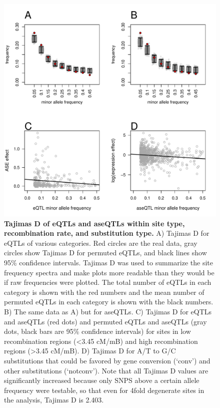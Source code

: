 \begin{figure}[ht]
      \centering
       \includegraphics[width=\linewidth]{Ch3FigS5}
    \caption{\textbf{Tajima\textsc{}s D of eQTLs and aseQTLs within site type, recombination rate, and substitution type.} A) Tajima\textsc{}s D for eQTLs of various categories. Red circles are the real data, gray circles show Tajima\textsc{}s D for permuted eQTLs, and black lines show 95\% confidence intervals. Tajima\textsc{}s D was used to summarize the site frequency spectra and make plots more readable than they would be if raw frequencies were plotted. The total number of eQTLs in each category is shown with the red numbers and the mean number of permuted eQTLs in each category is shown with the black numbers. B) The same data as A) but for aseQTLs. C) Tajima\textsc{}s D for eQTLs and aseQTLs (red dots) and permuted eQTLs and aseQTLs (gray dots, black bars are 95\% confidence intervals) for sites in low recombination regions (\textless 3.45 cM/mB) and high recombination regions (\textgreater 3.45 cM/mB). D) Tajima\textsc{}s D for A/T to G/C substitutions that could be favored by gene conversion (‘conv’) and other substitutions (‘notconv’). Note that all Tajima\textsc{}s D values are significantly increased because only SNPS above a certain allele frequency were testable, so that even for 4\-fold degenerate sites in the analysis, Tajima\textsc{}s D is 2.403.}
    \label{fig:3figS5}
\end{figure}

